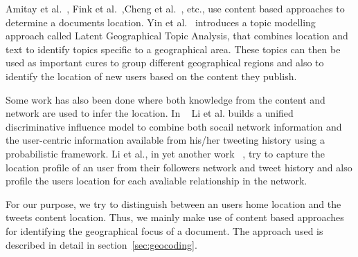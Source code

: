 Amitay et al.~\cite{amitay2004web}, Fink et al.~\cite{geoBlogs},Cheng et al.~\cite{youAreTweet}, etc., use content based approaches to determine a documents location. Yin et al.~\cite{geoTopic} introduces a topic modelling approach called Latent Geographical Topic Analysis, that combines location and text to identify topics specific to a geographical area. These topics can then be used as important cures to group different geographical regions and also to identify the location of new users based on the content they publish.

Some work has also been done where both knowledge from the content and network are used to infer the location. In ~\cite{geoUserprofiling} Li et al.  builds a unified discriminative influence model to  combine both socail network information and the user-centric information available from his/her tweeting history using a probabilistic framework. Li et al., in yet another work ~\cite{geoMLP}, try to capture the location profile of an user from their followers network and tweet history and also profile the users location for each avaliable relationship in the network.

For our purpose, we try to distinguish between an users home location and the tweets content location.  Thus, we mainly make use of content based approaches for identifying the geographical focus of a document. The approach used is described in detail in section~\ref{sec:geocoding}.
